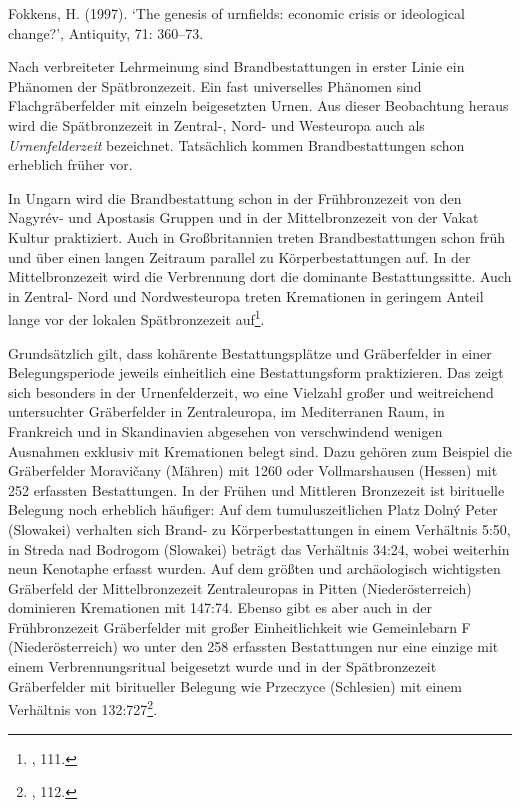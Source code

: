 \documentclass[openany,twoside,twocolumn]{book}
\let\rmarkdownfootnote\footnote%
\def\footnote{\protect\rmarkdownfootnote}
\begin{document}
Fokkens, H. (1997). `The genesis of urnfields: economic crisis or
ideological change?', Antiquity, 71: 360--73.

Nach verbreiteter Lehrmeinung sind Brandbestattungen in erster Linie ein
Phänomen der Spätbronzezeit. Ein fast universelles Phänomen sind
Flachgräberfelder mit einzeln beigesetzten Urnen. Aus dieser Beobachtung
heraus wird die Spätbronzezeit in Zentral-, Nord- und Westeuropa auch
als \emph{Urnenfelderzeit} bezeichnet. Tatsächlich kommen
Brandbestattungen schon erheblich früher vor.

In Ungarn wird die Brandbestattung schon in der Frühbronzezeit von den
Nagyrév- und Apostasis Gruppen und in der Mittelbronzezeit von der Vakat
Kultur praktiziert. Auch in Großbritannien treten Brandbestattungen
schon früh und über einen langen Zeitraum parallel zu Körperbestattungen
auf. In der Mittelbronzezeit wird die Verbrennung dort die dominante
Bestattungssitte. Auch in Zentral- Nord und Nordwesteuropa treten
Kremationen in geringem Anteil lange vor der lokalen Spätbronzezeit
auf\footnote{\textcite{harding_european_2000}, 111.}.

Grundsätzlich gilt, dass kohärente Bestattungsplätze und Gräberfelder in
einer Belegungsperiode jeweils einheitlich eine Bestattungsform
praktizieren. Das zeigt sich besonders in der Urnenfelderzeit, wo eine
Vielzahl großer und weitreichend untersuchter Gräberfelder in
Zentraleuropa, im Mediterranen Raum, in Frankreich und in Skandinavien
abgesehen von verschwindend wenigen Ausnahmen exklusiv mit Kremationen
belegt sind. Dazu gehören zum Beispiel die Gräberfelder Moravičany
(Mähren) mit 1260 oder Vollmarshausen (Hessen) mit 252 erfassten
Bestattungen. In der Frühen und Mittleren Bronzezeit ist birituelle
Belegung noch erheblich häufiger: Auf dem tumuluszeitlichen Platz Dolný
Peter (Slowakei) verhalten sich Brand- zu Körperbestattungen in einem
Verhältnis 5:50, in Streda nad Bodrogom (Slowakei) beträgt das
Verhältnis 34:24, wobei weiterhin neun Kenotaphe erfasst wurden. Auf dem
größten und archäologisch wichtigsten Gräberfeld der Mittelbronzezeit
Zentraleuropas in Pitten (Niederösterreich) dominieren Kremationen mit
147:74. Ebenso gibt es aber auch in der Frühbronzezeit Gräberfelder mit
großer Einheitlichkeit wie Gemeinlebarn F (Niederösterreich) wo unter
den 258 erfassten Bestattungen nur eine einzige mit einem
Verbrennungsritual beigesetzt wurde und in der Spätbronzezeit
Gräberfelder mit biritueller Belegung wie Przeczyce (Schlesien) mit
einem Verhältnis von 132:727\footnote{\textcite{harding_european_2000},
  112.}.
\end{document}
